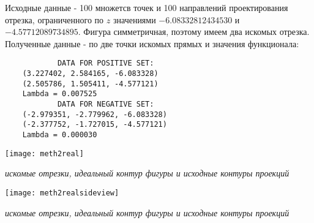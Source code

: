 Исходные данные - 100 множетсв точек и 100 направлений проектирования отрезка, ограниченного по $z$ значениями $-6.08332812434530$ и $-4.57712089734895$. Фигура симметричная, поэтому имеем два искомых отрезка.\\

Полученные данные - по две точки искомых прямых и значения функционала:

\begin{verbatim}
			DATA FOR POSITIVE SET:
	(3.227402, 2.584165, -6.083328)
	(2.505786, 1.505411, -4.577121)
	Lambda = 0.007525
			DATA FOR NEGATIVE SET:
	(-2.979351, -2.779962, -6.083328)
	(-2.377752, -1.727015, -4.577121)
	Lambda = 0.000030
\end{verbatim}

\begin{center}
	\texttt{[image: meth2real]}

	\textit{искомые отрезки, идеальный контур фигуры и исходные контуры проекций}

	\texttt{[image: meth2realsideview]}

	\textit{искомые отрезки, идеальный контур фигуры и исходные контуры проекций}
\end{center}

\newpage